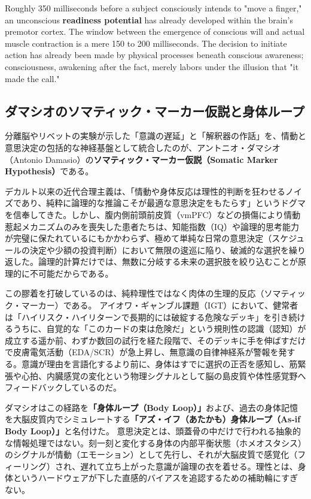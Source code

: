     Roughly 350 milliseconds before a subject consciously intends to "move a finger," an unconscious \textbf{readiness potential} has already developed within the brain's premotor cortex. The window between the emergence of conscious will and actual muscle contraction is a mere 150 to 200 milliseconds. The decision to initiate action has already been made by physical processes beneath conscious awareness; consciousness, awakening after the fact, merely labors under the illusion that "it made the call."
\fi

\ifja
    \subsection{ダマシオのソマティック・マーカー仮説と身体ループ}
    分離脳やリベットの実験が示した「意識の遅延」と「解釈器の作話」を、情動と意思決定の包括的な神経基盤として統合したのが、アントニオ・ダマシオ（Antonio Damasio）の\textbf{ソマティック・マーカー仮説（Somatic Marker Hypothesis）}である。

    デカルト以来の近代合理主義は、「情動や身体反応は理性的判断を狂わせるノイズであり、純粋に論理的な推論こそが最適な意思決定をもたらす」というドグマを信奉してきた。しかし、腹内側前頭前皮質（vmPFC）などの損傷により情動惹起メカニズムのみを喪失した患者たちは、知能指数（IQ）や論理的思考能力が完璧に保たれているにもかかわらず、極めて単純な日常の意思決定（スケジュールの決定や少額の投資判断）において無限の逡巡に陥り、破滅的な選択を繰り返した。論理的計算だけでは、無数に分岐する未来の選択肢を絞り込むことが原理的に不可能だからである。

    この膠着を打破しているのは、純粋理性ではなく肉体の生理的反応（ソマティック・マーカー）である。
    アイオワ・ギャンブル課題（IGT）において、健常者は「ハイリスク・ハイリターンで長期的には破綻する危険なデッキ」を引き続けるうちに、自覚的な「このカードの束は危険だ」という規則性の認識（認知）が成立する遥か前、わずか数回の試行を経た段階で、そのデッキに手を伸ばすだけで皮膚電気活動（EDA/SCR）が急上昇し、無意識の自律神経系が警報を発する。意識が理由を言語化するより前に、身体はすでに選択の正否を感知し、筋緊張や心拍、内臓感覚の変化という物理シグナルとして脳の島皮質や体性感覚野へフィードバックしているのだ。

    ダマシオはこの経路を\textbf{「身体ループ（Body Loop）」}および、過去の身体記憶を大脳皮質内でシミュレートする\textbf{「アズ・イフ（あたかも）身体ループ（As-if Body Loop）」}と名付けた。
    意思決定とは、頭蓋骨の中だけで行われる抽象的な情報処理ではない。刻一刻と変化する身体の内部平衡状態（ホメオスタシス）のシグナルが情動（エモーション）として先行し、それが大脳皮質で感覚化（フィーリング）され、遅れて立ち上がった意識が論理の衣を着せる。理性とは、身体というハードウェアが下した直感的バイアスを追認するための補助輪にすぎない。
\else

